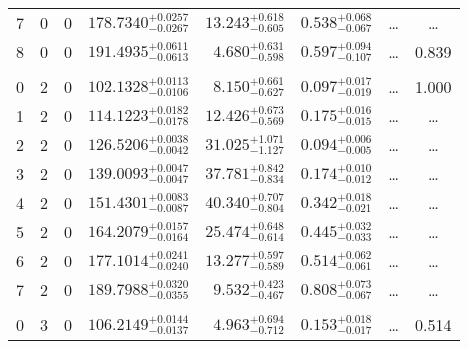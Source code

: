 \begin{table*}[!]
\begin{tabular}{llcrrlrc}
7 & 0 & 0 & $    178.7340_{-      0.0267}^{+      0.0257}$ & $      13.243_{-       0.605}^{+       0.618}$ & $       0.538_{-       0.067}^{+       0.068}$ & \multicolumn{1}{c}{\dots} & \dots \\[1pt]
8 & 0 & 0 & $    191.4935_{-      0.0613}^{+      0.0611}$ & $       4.680_{-       0.598}^{+       0.631}$ & $       0.597_{-       0.107}^{+       0.094}$ & \multicolumn{1}{c}{\dots} & 0.839\\[1pt]
\hline \\[-8pt]
0 & 2 & 0 & $    102.1328_{-      0.0106}^{+      0.0113}$ & $       8.150_{-       0.627}^{+       0.661}$ & $       0.097_{-       0.019}^{+       0.017}$ & \multicolumn{1}{c}{\dots} & 1.000\\[1pt]
1 & 2 & 0 & $    114.1223_{-      0.0178}^{+      0.0182}$ & $      12.426_{-       0.569}^{+       0.673}$ & $       0.175_{-       0.015}^{+       0.016}$ & \multicolumn{1}{c}{\dots} & \dots \\[1pt]
2 & 2 & 0 & $    126.5206_{-      0.0042}^{+      0.0038}$ & $      31.025_{-       1.127}^{+       1.071}$ & $       0.094_{-       0.005}^{+       0.006}$ & \multicolumn{1}{c}{\dots} & \dots \\[1pt]
3 & 2 & 0 & $    139.0093_{-      0.0047}^{+      0.0047}$ & $      37.781_{-       0.834}^{+       0.842}$ & $       0.174_{-       0.012}^{+       0.010}$ & \multicolumn{1}{c}{\dots} & \dots \\[1pt]
4 & 2 & 0 & $    151.4301_{-      0.0087}^{+      0.0083}$ & $      40.340_{-       0.804}^{+       0.707}$ & $       0.342_{-       0.021}^{+       0.018}$ & \multicolumn{1}{c}{\dots} & \dots \\[1pt]
5 & 2 & 0 & $    164.2079_{-      0.0164}^{+      0.0157}$ & $      25.474_{-       0.614}^{+       0.648}$ & $       0.445_{-       0.033}^{+       0.032}$ & \multicolumn{1}{c}{\dots} & \dots \\[1pt]
6 & 2 & 0 & $    177.1014_{-      0.0240}^{+      0.0241}$ & $      13.277_{-       0.589}^{+       0.597}$ & $       0.514_{-       0.061}^{+       0.062}$ & \multicolumn{1}{c}{\dots} & \dots \\[1pt]
7 & 2 & 0 & $    189.7988_{-      0.0355}^{+      0.0320}$ & $       9.532_{-       0.467}^{+       0.423}$ & $       0.808_{-       0.067}^{+       0.073}$ & \multicolumn{1}{c}{\dots} & \dots \\[1pt]
\hline \\[-8pt]
0 & 3 & 0 & $    106.2149_{-      0.0137}^{+      0.0144}$ & $       4.963_{-       0.712}^{+       0.694}$ & $       0.153_{-       0.017}^{+       0.018}$ & \multicolumn{1}{c}{\dots} & 0.514\\[1pt]

\end{tabular}
\end{table*}
